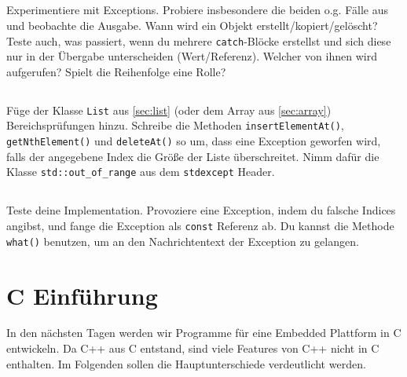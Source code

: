 \subsection{}
Experimentiere mit Exceptions.
Probiere insbesondere die beiden o.g. Fälle aus und beobachte die Ausgabe.
Wann wird ein Objekt erstellt/kopiert/gelöscht?
Teste auch, was passiert, wenn du mehrere \texttt{catch}-Blöcke erstellst und sich diese nur in der Übergabe unterscheiden (Wert/Referenz). Welcher von ihnen wird aufgerufen?
Spielt die Reihenfolge eine Rolle?

\subsection{}
Füge der Klasse \texttt{List} aus \ref{sec:list} (oder dem Array aus \ref{sec:array}) Bereichsprüfungen hinzu.
Schreibe die Methoden \texttt{insertElementAt()}, \texttt{getNthElement()} und \texttt{deleteAt()} so um, dass eine Exception geworfen wird, falls der angegebene Index die Größe der Liste überschreitet.
Nimm dafür die Klasse \texttt{std::out\_of\_range} aus dem \texttt{stdexcept} Header.

\subsection{}
Teste deine Implementation.
Provoziere eine Exception, indem du falsche Indices angibst, und fange die Exception als \texttt{const} Referenz ab. Du kannst die Methode \texttt{what()} benutzen, um an den Nachrichtentext der Exception zu gelangen.



\newpage

\section{C Einführung}
In den nächsten Tagen werden wir Programme für eine Embedded Plattform in C entwickeln.
Da C++ aus C entstand, sind viele Features von C++ nicht in C enthalten. Im Folgenden sollen die Hauptunterschiede verdeutlicht werden.

